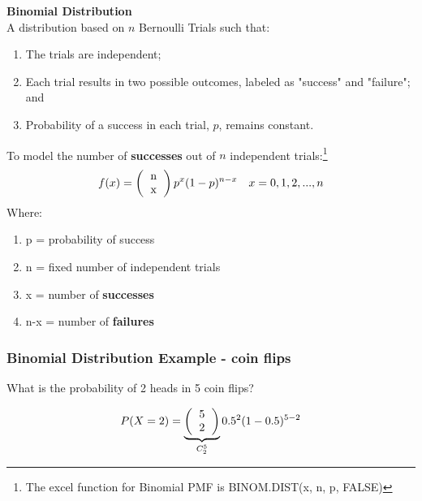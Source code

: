 \documentclass[../INDE315.tex]{subfiles}
\begin{document}
\begin{defn}
    \textbf{Binomial Distribution} \\
    A distribution based on $n$ Bernoulli Trials such that:
    \begin{enumerate}
        \item The trials are independent;
        \item Each trial results in two possible outcomes, labeled as "success" and "failure"; and
        \item Probability of a success in each trial, $p$, remains constant.
    \end{enumerate}
    To model the number of \textbf{successes} out of $n$ independent trials:\footnote{The excel function for Binomial PMF is BINOM.DIST(x, n, p, FALSE)}
    \begin{equation*}
        \begin{aligned}
            f(x) = \left( \begin{tabular}{c}
                n \\
                x
                \end{tabular}  \right) p^x (1 - p)^{n-x} \quad x = 0, 1, 2, ...,n
        \end{aligned}
    \end{equation*}
    Where:
    \begin{enumerate}
        \item p = probability of success
        \item n = fixed number of independent trials
        \item x = number of \textbf{successes}
        \item n-x = number of \textbf{failures}
    \end{enumerate}
\end{defn}

\subsubsection*{Binomial Distribution Example - coin flips}
\begin{exmp}
    What is the probability of 2 heads in 5 coin flips?
\end{exmp}
\begin{equation*}
    \begin{aligned}
        P(X = 2) = \underbrace{\left( \begin{tabular}{c}
            5 \\
            2
            \end{tabular}  \right)}_{C^5_2} 0.5^2 (1 - 0.5)^{5-2}
    \end{aligned}
\end{equation*}
\end{document}
